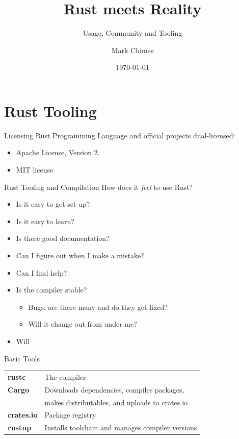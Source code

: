 \documentclass{beamer}
\title{Rust meets Reality}
\subtitle{Usage, Community and Tooling}
\author{Mark Chimes}
\date{\today}
\begin{document}
\begin{frame}
    \titlepage
\end{frame}


\section{Rust Tooling} 



\begin{frame}{Licensing} 
Rust Programming Language and official projects dual-licensed:
\begin{itemize}[label=$\bullet$] 
\item
Apache License, Version 2.
\item
MIT license
\end{itemize}
\end{frame} 

\begin{frame}{Rust Tooling and Compilation} 
How does it \emph{feel} to use Rust? 

\begin{itemize} [label=$\bullet$] 
\item Is it easy to get set up? 
\item Is it easy to learn? 
\item Is there good documentation? 
\item Can I figure out when I make a mistake? 
\item Can I find help? 
\item Is the compiler stable?
	\begin{itemize}
	\item
	Bugs: are there many and do they get fixed?  
	\item 
	Will it change out from under me?
	\end{itemize} 
\item Will 
\end{itemize} 
\end{frame} 

\begin{frame}{Basic Tools} 
\begin{block}{}
\begin{tabular}{@{}l l@{}}
\textbf{rustc}        & The compiler \\
\textbf{Cargo}        & Downloads dependencies, compiles packages, 
\\ & makes distributables, and uploads to crates.io \\
\textbf{crates.io}    & Package registry \\
\textbf{rustup}       & Installs toolchain and manages compiler versions \\
\end{tabular}
\end{block}
\end{frame}
\end{document}
